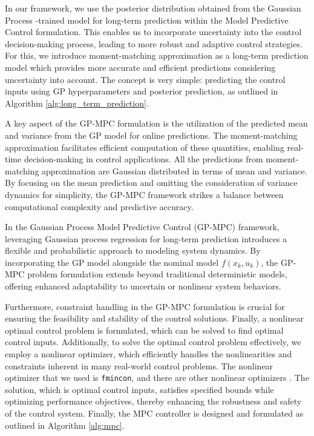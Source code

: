 In our framework, we use the posterior distribution obtained from the Gaussian Process -trained model for long-term prediction within the Model Predictive Control  formulation. This enables us to incorporate uncertainty into the control decision-making process, leading to more robust and adaptive control strategies. For this, we introduce moment-matching approximation as a long-term prediction model which provides more accurate and efficient predictions considering uncertainty into account. The concept is very simple: predicting the control inputs using GP hyperparameters and posterior prediction, as outlined in Algorithm \ref{alg:long_term_prediction}.

A key aspect of the GP-MPC formulation is the utilization of the predicted mean and variance from the GP model for online predictions. The moment-matching approximation facilitates efficient computation of these quantities, enabling real-time decision-making in control applications. All the predictions from moment-matching approximation are Gaussian distributed in terms of mean and variance. By focusing on the mean prediction and omitting the consideration of variance dynamics for simplicity, the GP-MPC framework strikes a balance between computational complexity and predictive accuracy.

In the Gaussian Process Model Predictive Control (GP-MPC) framework, leveraging Gaussian process regression for long-term prediction introduces a flexible and probabilistic approach to modeling system dynamics. By incorporating the GP model alongside the nominal model $f(x_k, u_k)$, the GP-MPC problem formulation extends beyond traditional deterministic models, offering enhanced adaptability to uncertain or nonlinear system behaviors.

Furthermore, constraint handling in the GP-MPC formulation is crucial for ensuring the feasibility and stability of the control solutions. Finally, a nonlinear optimal control problem is formulated, which can be solved to find optimal control inputs. Additionally, to solve the optimal control problem effectively, we employ a nonlinear optimizer, which efficiently handles the nonlinearities and constraints inherent in many real-world control problems. The nonlinear optimizer that we used is \texttt{fmincon}, and there are other nonlinear optimizers \cite{verschueren2019acados}. The solution, which is optimal control inputs, satisfies specified bounds while optimizing performance objectives, thereby enhancing the robustness and safety of the control system. Finally, the MPC controller is designed and formulated as outlined in Algorithm \ref{alg:mpc}. 

